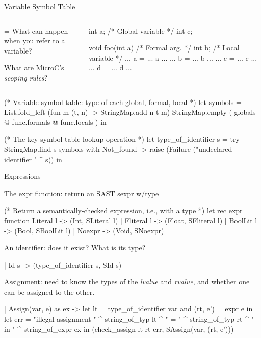 \documentclass{plt}
\begin{document}
\begin{frame}[fragile=singleslide]{Variable Symbol Table}

\begin{columns}
\begin{column}{0.4\textwidth}
\parskip=\baselineskip
What can happen when you refer to a variable?

What are MicroC's \emph{scoping rules}?
\end{column}
\begin{column}{0.6\textwidth}
\begin{C}
int a;    /* Global variable */
int c;

void foo(int a) { /* Formal arg. */
  int b;  /* Local variable  */
  ... a = ... a ...
  ... b = ... b ...
  ... c = ... c ...
  ... d = ... d ...
}
\end{C}
\end{column}
\end{columns}

\begin{ocaml}
    (* Variable symbol table: type of each global, formal, local *)
    let symbols = List.fold_left
                   (fun m (t, n) -> StringMap.add n t m)
                   StringMap.empty
                   ( globals @ func.formals @ func.locals )
    in

    (* The key symbol table lookup operation *)
    let type_of_identifier s =
      try StringMap.find s symbols
      with Not_found ->
        raise (Failure ("undeclared identifier " ^ s))
    in
\end{ocaml}
\end{frame}

\begin{frame}[fragile=singleslide]{Expressions}

The expr function: return an SAST sexpr w/type

\begin{ocaml}
(* Return a semantically-checked expression, i.e., with a type *)
let rec expr = function
    Literal  l -> (Int,   SLiteral l)
  | Fliteral l -> (Float, SFliteral l)
  | BoolLit l  -> (Bool,  SBoolLit l)
  | Noexpr     -> (Void,  SNoexpr)
\end{ocaml}

An identifier: does it exist? What is its type?

\begin{ocaml}
  | Id s       -> (type_of_identifier s, SId s)
\end{ocaml}

Assignment: need to know the types of the \emph{lvalue} and
\emph{rvalue}, and whether one can be assigned to the other.

\begin{ocaml}
  | Assign(var, e) as ex -> 
      let lt = type_of_identifier var
      and (rt, e') = expr e in
      let err = "illegal assignment " ^ string_of_typ lt ^ " = " ^ 
        string_of_typ rt ^ " in " ^ string_of_expr ex
      in (check_assign lt rt err, SAssign(var, (rt, e')))
\end{ocaml}
 
\end{frame}
\end{document}
